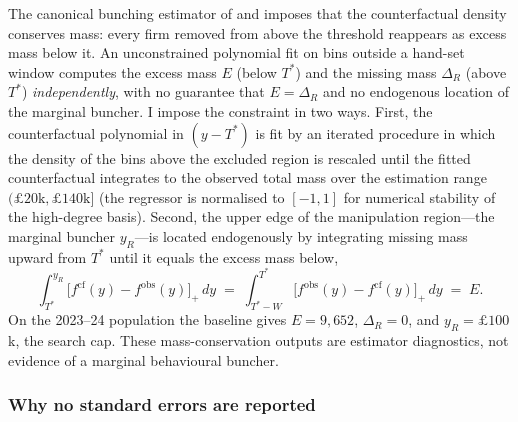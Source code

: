 The canonical bunching estimator of \citet{chettyetal2011} and
\citet{klevenwaseem2013} imposes that the counterfactual density conserves
mass: every firm removed from above the threshold reappears as excess mass
below it. An unconstrained polynomial fit on bins outside a hand-set window
computes the excess mass $E$ (below $T^{*}$) and the missing mass $\Delta_{R}$
(above $T^{*}$) \emph{independently}, with no guarantee that $E=\Delta_{R}$
and no endogenous location of the marginal buncher. I impose the constraint in
two ways. First, the counterfactual polynomial in $(y-T^{*})$ is fit by an
iterated procedure in which the density of the bins above the excluded region
is rescaled until the fitted counterfactual integrates to the observed total
mass over the estimation range $(\pounds20\text{k},\pounds140\text{k}]$ (the
regressor is normalised to $[-1,1]$ for numerical stability of the
high-degree basis). Second, the upper edge of the manipulation region---the
marginal buncher $y_{R}$---is located endogenously by integrating missing mass
upward from $T^{*}$ until it equals the excess mass below,
\[
  \int_{T^{*}}^{y_{R}} \bigl[f^{\mathrm{cf}}(y)-f^{\mathrm{obs}}(y)\bigr]_{+}\,dy
  \;=\;
  \int_{T^{*}-W}^{T^{*}} \bigl[f^{\mathrm{obs}}(y)-f^{\mathrm{cf}}(y)\bigr]_{+}\,dy
  \;=\; E .
\]
On the 2023--24 population the baseline gives $E=9{,}652$,
$\Delta_R=0$, and
$y_R=\pounds100$k, the search cap. These
mass-conservation outputs are estimator diagnostics, not evidence of a
marginal behavioural buncher.

\subsubsection*{Why no standard errors are reported}

